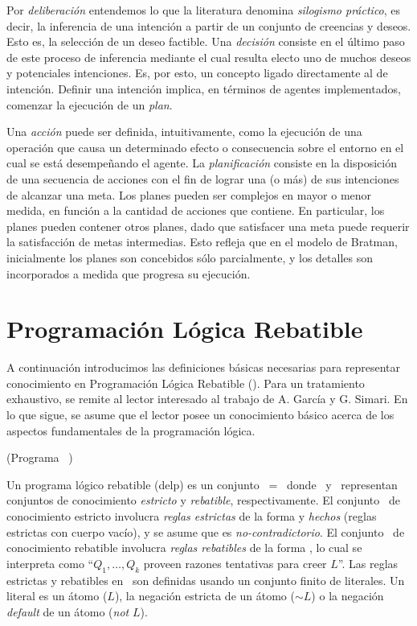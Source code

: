  Por \textit{deliberación} entendemos lo que la literatura denomina
 \textit{silogismo práctico}, es decir, la inferencia de una intención
 a partir de un conjunto de creencias y deseos.
 Esto es, la selección de un deseo factible.
 Una \textit{decisión}  consiste en el último paso de este proceso de
 inferencia mediante el cual  resulta electo uno de muchos deseos y
 potenciales intenciones.
 Es, por esto, un concepto ligado directamente al de intención.
 Definir una intención implica, en  términos de agentes implementados,
 comenzar la ejecución de un \textit{plan}.
 
 Una \textit{acción} puede ser definida, intuitivamente, como la
 ejecución de una operación que causa un determinado efecto o
 consecuencia sobre el entorno en el cual se está desempeñando el
 agente.
 La \textit{planificación} consiste  en la disposición de una secuencia
 de acciones con el fin de lograr una (o más) de sus intenciones de
 alcanzar una meta.
 Los planes pueden ser complejos en mayor o menor medida, en función a
 la cantidad de acciones que contiene.
 En  particular, los planes pueden contener otros planes, dado que
 satisfacer una meta puede requerir la satisfacción de metas
 intermedias.
 Esto refleja que en  el modelo de Bratman, inicialmente los planes son
 concebidos sólo parcialmente,  y los detalles son incorporados a
 medida que progresa su ejecución.

\section{Programación Lógica Rebatible}
 \label{sec:programacion_logica_rebatible}
 
 A continuación introducimos las definiciones básicas necesarias para
 representar conocimiento en Programación Lógica Rebatible (\DLP). Para
 un tratamiento exhaustivo, se remite al lector interesado al trabajo
 de A. García y G. Simari\cite{delp04}.  En lo que sigue, se asume que
 el lector posee un conocimiento básico acerca de los aspectos
 fundamentales de la programación lógica.

 \begin{definicion}(Programa \DLP\ \PP)
 \label{def:programa_delp}
 
 Un programa lógico rebatible (delp) es un conjunto \PP\ = \SD\ donde
 \SSet\ y \DD\ representan conjuntos de conocimiento \textit{estricto}
 y \textit{rebatible}, respectivamente. El conjunto \SSet\ de
 conocimiento estricto involucra \textit{reglas estrictas} de la forma
  y \textit{hechos} (reglas estrictas con
 cuerpo vacío), y se asume que es \textit{no-contradictorio}.  El
 conjunto \DD\ de conocimiento rebatible involucra \textit{reglas
 rebatibles} de la forma  , lo cual se
 interpreta como ``$Q_1,\ldots,Q_k$ proveen razones tentativas  para
 creer $L$''. Las reglas estrictas y rebatibles en \DLP\ son definidas
 usando un conjunto  finito de literales. Un literal es un átomo ($L$),
 la negación estricta de un átomo ($\sim L$) o  la negación
 \textit{default} de un átomo (\textit{not} $L$).
 
 \end{definicion}
 
